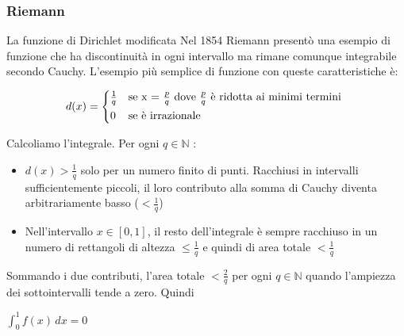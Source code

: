 \begin{frame}[label=Riemann]
  \frametitle{Riemann}
  \begin{block}{La funzione di Dirichlet modificata}    
    Nel 1854 Riemann presentò una esempio di funzione che ha discontinuità in ogni intervallo ma rimane comunque integrabile secondo Cauchy.
    L'esempio più semplice di funzione con queste caratteristiche è:    

    \begin{equation}
      d(x) =
      \begin{cases*}
        \frac{1}{q} & se x = $\frac{p}{q}$ dove $\frac{p}{q}$ è ridotta ai minimi termini \\
        0 & se è irrazionale
      \end{cases*}
    \end{equation}

    Calcoliamo l'integrale. Per ogni $q \in \mathbb{N}$ :
    \begin{itemize}
      \item $d(x) > \frac{1}{q}$ solo per un numero finito di punti. Racchiusi in intervalli sufficientemente piccoli, 
      il loro contributo alla somma di Cauchy diventa arbitrariamente basso ($ < \frac{1}{q} $)
      \item Nell'intervallo $x \in [0,1]$, il resto dell'integrale è sempre racchiuso in un numero di rettangoli 
      di altezza $\leq \frac{1}{q}$ e quindi di area totale $< \frac{1}{q}$
    \end{itemize}

    Sommando i due contributi, l'area totale $< \frac{2}{q}$ per ogni $q \in \mathbb{N}$ quando l'ampiezza dei sottointervalli tende a zero. Quindi
    \begin{center}
      $\int_{0}^{1} f(x) \,dx = 0$
    \end{center}
    \end{block}    
\end{frame}


